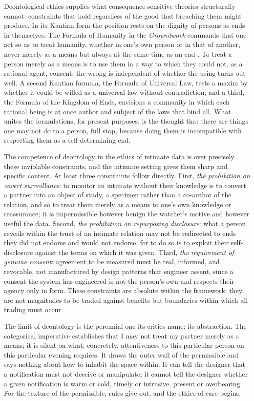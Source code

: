 Deontological ethics supplies what consequence-sensitive theories structurally cannot: constraints that hold regardless of the good that breaching them might produce. In its Kantian form the position rests on the dignity of persons as ends in themselves. The Formula of Humanity in the \emph{Groundwork} commands that one act so as to treat humanity, whether in one's own person or in that of another, never merely as a means but always at the same time as an end \parencite{kant1785groundwork}. To treat a person merely as a means is to use them in a way to which they could not, as a rational agent, consent; the wrong is independent of whether the using turns out well. A second Kantian formula, the Formula of Universal Law, tests a maxim by whether it could be willed as a universal law without contradiction, and a third, the Formula of the Kingdom of Ends, envisions a community in which each rational being is at once author and subject of the laws that bind all. What unites the formulations, for present purposes, is the thought that there are things one may not do to a person, full stop, because doing them is incompatible with respecting them as a self-determining end.

The competence of deontology in the ethics of intimate data is over precisely these inviolable constraints, and the intimate setting gives them sharp and specific content. At least three constraints follow directly. First, \emph{the prohibition on covert surveillance}: to monitor an intimate without their knowledge is to convert a partner into an object of study, a specimen rather than a co-author of the relation, and so to treat them merely as a means to one's own knowledge or reassurance; it is impermissible however benign the watcher's motive and however useful the data. Second, \emph{the prohibition on repurposing disclosure}: what a person reveals within the trust of an intimate relation may not be redirected to ends they did not endorse and would not endorse, for to do so is to exploit their self-disclosure against the terms on which it was given. Third, \emph{the requirement of genuine consent}: agreement to be measured must be real, informed, and revocable, not manufactured by design patterns that engineer assent, since a consent the system has engineered is not the person's own and respects their agency only in form. These constraints are absolute within the framework: they are not magnitudes to be traded against benefits but boundaries within which all trading must occur.

The limit of deontology is the perennial one its critics name: its abstraction. The categorical imperative establishes that I may not treat my partner merely as a means; it is silent on what, concretely, attentiveness to this particular person on this particular evening requires. It draws the outer wall of the permissible and says nothing about how to inhabit the space within. It can tell the designer that a notification must not deceive or manipulate; it cannot tell the designer whether a given notification is warm or cold, timely or intrusive, present or overbearing. For the texture of the permissible, rules give out, and the ethics of care begins.

